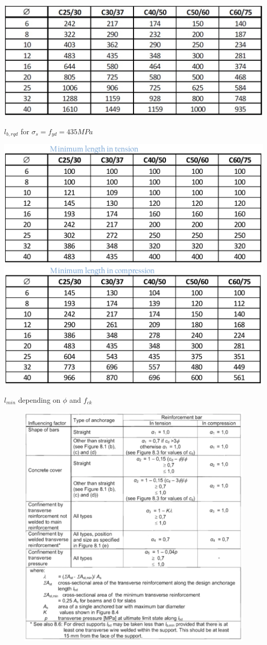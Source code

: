 \documentclass[landscape]{article}
\begin{document}
\begin{multicols*}{2}
\begin{table}[H]
  \centering
  \includegraphics[width = .9\linewidth]{img/l_table.png}
  \caption{$l_{b,rqd}$ for $\sigma_s= f_{yd}=435MPa$}
  \label{tab:l_table}
\end{table}
\begin{table}[H]
  \centering
  \includegraphics[width = .4\linewidth]{img/l_table_tens.png}
  \includegraphics[width = .4\linewidth]{img/l_table_comp.png}
  \caption{$l_{min}$ depending on $\phi$ and $f_{ck}$}
  \label{tab:l_min}
\end{table}
\begin{figure}[H]
  \centering
  \includegraphics[width = .9\linewidth]{img/alpha.png}\\

\end{figure}
\end{multicols*}
\end{document}
